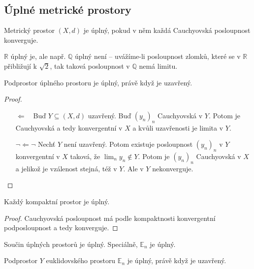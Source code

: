 \documentclass[../main.tex]{subfiles}
\begin{document}
\subsection{Úplné metrické prostory}

\begin{definition}
	Metrický prostor $(X,d)$ je úplný, pokud v něm každá Cauchyovská posloupnost konverguje.
\end{definition}

\begin{example}
	$\mathbb{R}$ úplný je, ale např. $\mathbb{Q}$ úplný není -- uvážíme-li posloupnost zlomků, které se v $\mathbb{R}$ přibližují k $\sqrt{2}$, tak taková posloupnost v $\mathbb{Q}$ nemá limitu.
\end{example}

\begin{lemma}
	Podprostor úplného prostoru je úplný, právě když je uzavřený.
\end{lemma}

\begin{proof}
	\begin{enumerate}
		\item[$\Leftarrow \phantom{\lnot} $] Buď $Y \subseteq (X,d)$ uzavřený. Buď $(y_n)_n$ Cauchyovská v $Y$. Potom je Cauchyovská 
	    a tedy konvergentní v $X$ a kvůli uzavřenosti je limita v $Y$.
	    \item[$\lnot \Leftarrow \lnot $] Nechť $Y$ není uzavřený. Potom existuje posloupnost $(y_n)_n$ v $Y$ konvergentní v $X$ taková, že $\lim_n y_n \notin Y$.
	    Potom je $(y_n)_n$ Cauchyovská v $X$ a jelikož je vzálenost stejná, též v $Y$. Ale v $Y$ nekonverguje.
	\end{enumerate}
\end{proof}

\begin{lemma}
	Každý kompaktní prostor je úplný.
\end{lemma}

\begin{proof}
	Cauchyovská posloupnost má podle kompaktnosti konvergentní podposloupnost a tedy konverguje.
\end{proof}

\begin{theorem}
	Součin úplných prostorů je úplný. Speciálně, $\mathbb{E}_n$ je úplný.
\end{theorem}

\begin{consequence}
	Podprostor $Y$ euklidovského prostoru $\mathbb{E}_n$ je úplný, právě když je uzavřený.
\end{consequence}
\end{document}
